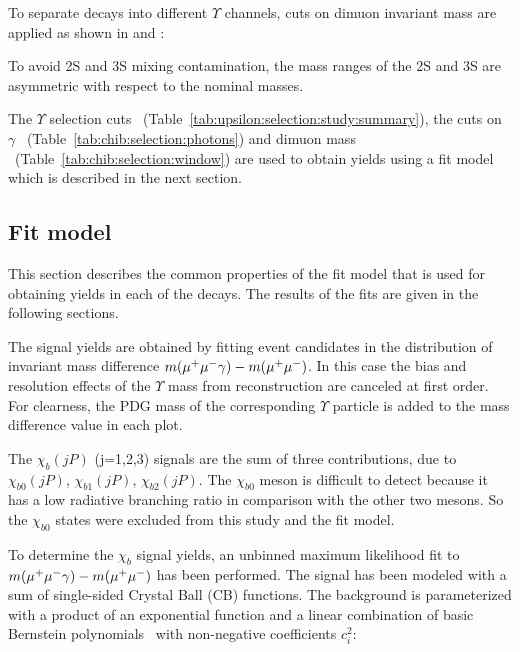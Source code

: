 

To separate decays into different $\Upsilon$ channels, cuts on dimuon invariant mass are 
applied as shown in  and :




To avoid \Y2S and \Y3S mixing contamination, the mass ranges of the \Y2S and \Y3S are
asymmetric with respect to the nominal masses.

The $\Upsilon$ selection cuts
~(Table~\ref{tab:upsilon:selection:study:summary}), the cuts  on $\gamma$
~(Table~\ref{tab:chib:selection:photons}) and dimuon mass  
~(Table~\ref{tab:chib:selection:window}) are used to obtain \chib yields
using a fit model which is described in the next section.


\subsection{Fit model}
\label{sec:chib:fit}

This section describes the common properties of the fit model that is used for
obtaining yields in each of the \chib decays. The results of the fits are
given in the following sections.

The \chib signal yields are obtained by fitting event candidates
in the distribution of invariant mass difference $m(\mu^+\mu^-\gamma) - m(\mu^+\mu^-)$.
In this case the bias and resolution effects of the $\Upsilon$ mass from reconstruction
are canceled at first order. For clearness, the PDG mass of the corresponding $\Upsilon$
particle is added to the mass difference value in each plot.

The $\chi_b(jP)$ (j=1,2,3) signals are the sum of three contributions, due to $\chi_{b0}(jP)$,
$\chi_{b1}(jP)$, $\chi_{b2}(jP)$. The $\chi_{b0}$ meson is difficult to detect
because it has a low radiative branching ratio in comparison with the other two
mesons. So the $\chi_{b0}$ states were excluded from this study and the fit
model.

To determine the $\chi_b$ signal yields, an unbinned maximum likelihood fit to
$m(\mu^+\mu^-\gamma) - m(\mu^+\mu^-)$ has been performed. The signal has been modeled with
a sum of single-sided Crystal Ball (CB)  functions. The background is parameterized with a
product of an exponential function and a linear combination of basic Bernstein
polynomials~\cite{Phillips:2003} with non-negative coefficients $c_{i}^2$:

